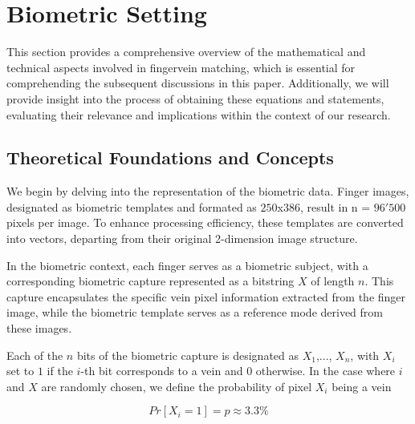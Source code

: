 \section{Biometric Setting}

This section provides a comprehensive overview of the mathematical and technical aspects involved in fingervein matching, which is essential for comprehending the subsequent discussions in this paper. Additionally, we will provide insight into the process of obtaining these equations and statements, evaluating their relevance and implications within the context of our research. 


\subsection{Theoretical Foundations and Concepts}

We begin by delving into the representation of the biometric data. Finger images, designated as biometric templates and formated as \(250\)x\(386\), result in n = \(96'500\) pixels per image. To enhance processing efficiency, these templates are converted into vectors, departing from their original 2-dimension image structure. 

In the biometric context, each finger serves as a biometric subject, with a corresponding biometric capture represented as a bitstring \(X\) of length \(n\). This capture encapsulates the specific vein pixel information extracted from the finger image, while the biometric template serves as a reference mode derived from these images. 

Each of the \(n\) bits of the biometric capture is designated as \(X_1\),..., \(X_n\), with \(X_i\) set to \(1\) if the \(i\)-th bit corresponds to a vein and \(0\) otherwise. In the case where \(i\) and \(X\) are randomly chosen, we define the probability of pixel \(X_i\) being a vein 

\begin{equation} \label{eq:proba}
    Pr[X_i = 1] = p \approx 3.3 \% 
\end{equation}

